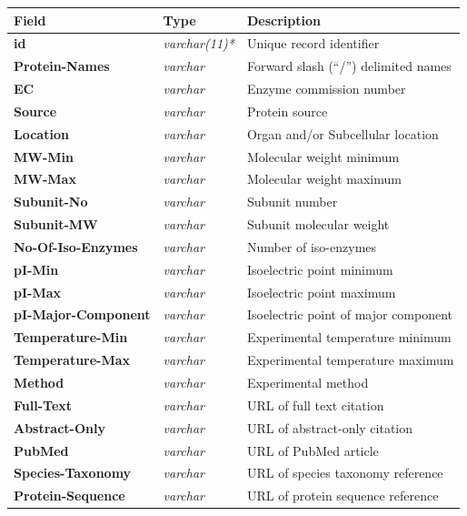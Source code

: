 \newpage
\begin{table}[H]
\centering
\begin{tabular}{| l | l | l |}
\hline
\textbf{Field} & \textbf{Type} & \textbf{Description}\\
\hline
\textbf{id} & \textit{varchar(11)*} & Unique record identifier\\
\textbf{Protein-Names} & \textit{varchar} & Forward slash (``/'') delimited names\\
\textbf{EC} & \textit{varchar} & Enzyme commission number\\
\textbf{Source} & \textit{varchar} & Protein source\\
\textbf{Location} & \textit{varchar} & Organ and/or Subcellular location\\
\textbf{MW-Min} & \textit{varchar} & Molecular weight minimum\\
\textbf{MW-Max} & \textit{varchar} & Molecular weight maximum\\
\textbf{Subunit-No} & \textit{varchar} & Subunit number\\
\textbf{Subunit-MW} & \textit{varchar} & Subunit molecular weight\\
\textbf{No-Of-Iso-Enzymes} & \textit{varchar} & Number of iso-enzymes\\
\textbf{pI-Min} & \textit{varchar} & Isoelectric point minimum\\
\textbf{pI-Max} & \textit{varchar} & Isoelectric point maximum\\
\textbf{pI-Major-Component} & \textit{varchar} & Isoelectric point of major component\\
\textbf{Temperature-Min} & \textit{varchar} & Experimental temperature minimum\\
\textbf{Temperature-Max} & \textit{varchar} & Experimental temperature maximum\\
\textbf{Method} & \textit{varchar} & Experimental method\\
\textbf{Full-Text} & \textit{varchar} & URL of full text citation\\
\textbf{Abstract-Only} & \textit{varchar} & URL of abstract-only citation\\
\textbf{PubMed} & \textit{varchar} & URL of PubMed article\\
\textbf{Species-Taxonomy} & \textit{varchar} & URL of species taxonomy reference\\
\textbf{Protein-Sequence} & \textit{varchar} & URL of protein sequence reference\\

\end{tabular}
\end{table}
